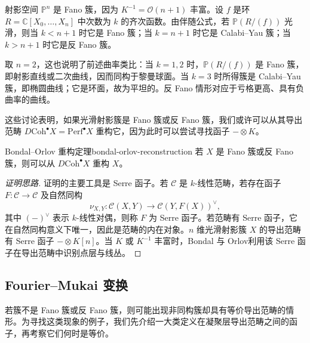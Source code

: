 \begin{example}[射影空间超曲面的分类]
射影空间 $\mathbb P^n$ 是 Fano 簇，因为 $K^{-1}=\mathcal O(n+1)$ 丰富。设 $f$ 是环 $R=\mathbb C[X_0,\ldots,X_n]$ 中次数为 $k$ 的齐次函数。由伴随公式，若 $\mathbb P(R/(f))$ 光滑，则当 $k<n+1$ 时它是 Fano 簇；当 $k=n+1$ 时它是 Calabi--Yau 簇；当 $k>n+1$ 时它是反 Fano 簇。

取 $n=2$，这也说明了前述曲率类比：当 $k=1,2$ 时，$\mathbb P(R/(f))$ 是 Fano 簇，即射影直线或二次曲线，因而同构于黎曼球面。当 $k=3$ 时所得簇是 Calabi--Yau 簇，即椭圆曲线；它是环面，故为平坦的。反 Fano 情形对应于亏格更高、具有负曲率的曲线。
\end{example}

这些讨论表明，如果光滑射影簇是 Fano 簇或反 Fano 簇，我们或许可以从其导出范畴 $D\mathrm{Coh}^{\bullet}X=\mathrm{Perf}^{\bullet}X$ 重构它，因为此时可以尝试寻找函子 $-\otimes K$。

\begin{theorem}{Bondal--Orlov 重构定理}{bondal-orlov-reconstruction}
若 $X$ 是 Fano 簇或反 Fano 簇，则可以从 $D\mathrm{Coh}^{\bullet}X$ 重构 $X$。
\end{theorem}
\begin{proof}[证明思路]
证明的主要工具是 Serre 函子。若 $\mathcal C$ 是 $k$-线性范畴，若存在函子 $F\colon\mathcal C\to\mathcal C$ 及自然同构
\[
  \nu_{X,Y}\colon\mathcal C(X,Y)\longrightarrow\mathcal C(Y,F(X))^\vee,
\]
其中 $(-)^\vee$ 表示 $k$-线性对偶，则称 $F$ 为 Serre 函子。若范畴有 Serre 函子，它在自然同构意义下唯一，因此是范畴的内在对象。$n$ 维光滑射影簇 $X$ 的导出范畴有 Serre 函子 $-\otimes K[n]$。当 $K$ 或 $K^{-1}$ 丰富时，Bondal 与 Orlov利用该 Serre 函子在导出范畴中识别点层与线丛。
\end{proof}

\subsection{Fourier--Mukai 变换}\label{subsec:fourier-mukai-transforms}
若簇不是 Fano 簇或反 Fano 簇，则可能出现非同构簇却具有等价导出范畴的情形。为寻找这类现象的例子，我们先介绍一大类定义在凝聚层导出范畴之间的函子，再考察它们何时是等价。

